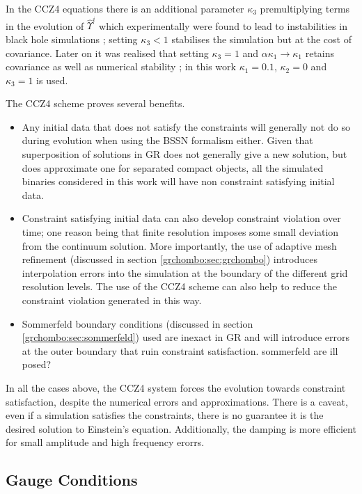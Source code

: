 In the CCZ4 equations there is an additional parameter $\kappa_3$ premultiplying terms in the evolution of $\hat{\Upsilon}^i$ which experimentally were found to lead to instabilities in black hole simulations \cite{PhysRevD.85.064040}; setting $\kappa_3<1$ stabilises the simulation but at the cost of covariance. Later on it was realised that setting $\kappa_3=1$ and $\alpha\kappa_1\rightarrow\kappa_1$ retains covariance as well as numerical stability \cite{Alic:2013xsa}; in this work $\kappa_1=0.1$, $\kappa_2=0$ and $\kappa_3=1$ is used.


The CCZ4 scheme proves several benefits. 
\begin{itemize}
\item Any initial data that does not satisfy the constraints will generally not do so during evolution when using the BSSN formalism either. Given that superposition of solutions in GR does not generally give a new solution, but does approximate one for separated compact objects, all the simulated binaries considered in this work will have non constraint satisfying initial data. 
\item Constraint satisfying initial data can also develop constraint violation over time; one reason being that finite resolution imposes some small deviation from the continuum solution. More importantly, the use of adaptive mesh refinement (discussed in section \ref{grchombo:sec:grchombo}) introduces interpolation errors into the simulation at the boundary of the different grid resolution levels. The use of the CCZ4 scheme can also help to reduce the constraint violation generated in this way.
\item Sommerfeld boundary conditions (discussed in section \ref{grchombo:sec:sommerfeld}) used are inexact in GR and will introduce errors at the outer boundary that ruin constraint satisfaction. \color{gren} sommerfeld are ill posed? \color{black}
\end{itemize}
In all the cases above, the CCZ4 system forces the evolution towards constraint satisfaction, despite the numerical errors and approximations. There is a caveat, even if a simulation satisfies the constraints, there is no guarantee it is the desired solution to Einstein's equation. \color{orchid} Additionally, the damping is more efficient for small amplitude and high frequency erorrs. \color{black}



\subsection{Gauge Conditions}\label{nr:sec:gaugeconditions}

